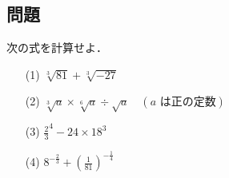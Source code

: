 \documentclass[8pt,dvipdfmx]{article}[b5paper]
\begin{document}
\begin{tcolorbox}[title=数学\textcircled{2} 1-1 AB]
\section*{問題}
次の式を計算せよ．

\begin{enumerate}
    \item[(1)] $\sqrt[3]{81} + \sqrt[3]{-27}$

    \vspace{2mm} %

    \item[(2)]$\sqrt[3]{a} \times \sqrt[6]{a} \div \sqrt{a} \quad (a \text{ は正の定数})$

    \vspace{2mm} %

    \item[(3)] $\frac{2}{3}^4 - 24 \times 18^3$
    
    \vspace{2mm} %

    \item[(4)] $8^{-\frac{2}{3}} + \left(\frac{1}{81}\right)^{-\frac{1}{4}}$

\end{enumerate}
\end{tcolorbox}

\end{document}
